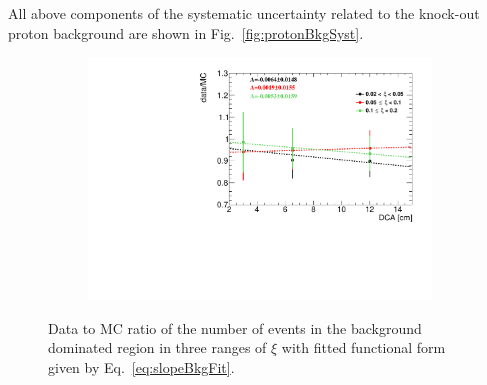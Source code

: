 All above components of the systematic uncertainty related to the knock-out proton background are shown in Fig.~\ref{fig:protonBkgSyst}.
 \captionsetup{format=plain,indention=0pt,justification=justified}
 
 \begin{figure}[h!]
 	\centering
 	\begin{subfigure}{.49\textwidth}
 		\includegraphics[width=\textwidth,page=1]{chapters/chrgSTAR/img/DCAproton/Ratio.pdf}
 	\end{subfigure}
 	\begin{minipage}{.49\textwidth}
 		\caption[Data to MC ratio of  the  number of events in the background dominated region  in three ranges of $\xi$]{Data to MC ratio of  the  number of events in the background dominated region in three ranges of $\xi$ with fitted functional form given by Eq.~\ref{eq:slopeBkgFit}.}
 		\label{fig:protonBkgSystRatio}
 	\end{minipage}
 	
 \end{figure}
 
